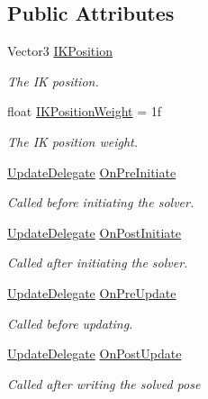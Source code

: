 \subsection*{Public Attributes}
\begin{DoxyCompactItemize}
\item 
Vector3 \mbox{\hyperlink{class_root_motion_1_1_final_i_k_1_1_i_k_solver_ab8cb39df45e14434ce7a18f2ca207ca7}{I\+K\+Position}}
\begin{DoxyCompactList}\small\item\em The IK position. \end{DoxyCompactList}\item 
float \mbox{\hyperlink{class_root_motion_1_1_final_i_k_1_1_i_k_solver_a8556d2cdc9eb04701ff0c2cf76cb0c88}{I\+K\+Position\+Weight}} = 1f
\begin{DoxyCompactList}\small\item\em The IK position weight. \end{DoxyCompactList}\item 
\mbox{\hyperlink{class_root_motion_1_1_final_i_k_1_1_i_k_solver_a237d83c7b9c6eace8a21aa5821f0a671}{Update\+Delegate}} \mbox{\hyperlink{class_root_motion_1_1_final_i_k_1_1_i_k_solver_a3a7df45ee2ab3b92d527910bde39f64e}{On\+Pre\+Initiate}}
\begin{DoxyCompactList}\small\item\em Called before initiating the solver. \end{DoxyCompactList}\item 
\mbox{\hyperlink{class_root_motion_1_1_final_i_k_1_1_i_k_solver_a237d83c7b9c6eace8a21aa5821f0a671}{Update\+Delegate}} \mbox{\hyperlink{class_root_motion_1_1_final_i_k_1_1_i_k_solver_ac8c1a894c1b45e84f9dd518077c73e25}{On\+Post\+Initiate}}
\begin{DoxyCompactList}\small\item\em Called after initiating the solver. \end{DoxyCompactList}\item 
\mbox{\hyperlink{class_root_motion_1_1_final_i_k_1_1_i_k_solver_a237d83c7b9c6eace8a21aa5821f0a671}{Update\+Delegate}} \mbox{\hyperlink{class_root_motion_1_1_final_i_k_1_1_i_k_solver_a509211f13d94e4a89be7e539c465e55a}{On\+Pre\+Update}}
\begin{DoxyCompactList}\small\item\em Called before updating. \end{DoxyCompactList}\item 
\mbox{\hyperlink{class_root_motion_1_1_final_i_k_1_1_i_k_solver_a237d83c7b9c6eace8a21aa5821f0a671}{Update\+Delegate}} \mbox{\hyperlink{class_root_motion_1_1_final_i_k_1_1_i_k_solver_a848d38a01f7498761a3f9964a66f0555}{On\+Post\+Update}}
\begin{DoxyCompactList}\small\item\em Called after writing the solved pose \end{DoxyCompactList}\end{DoxyCompactItemize}
